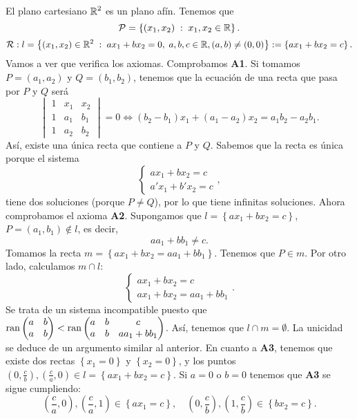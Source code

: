 \begin{eg}
El plano cartesiano $\displaystyle \mathbb{R}^{2} $ es un plano afín. Tenemos que 
\[\mathcal{P  } = \left\{ \left(x_{1}, x_{2}\right) \; : \; x_{1}, x_{2} \in \mathbb{R}\right\}.\]
\[\mathcal{R} : l = \left\{ \left(x_{1}, x_{2}\right) \in \mathbb{R}^{2} \; : \; ax_{1} + bx_{2} = 0, \; a,b,c \in \mathbb{R}, \left(a,b\right) \neq \left(0,0\right)\right\} := \left\{ ax_{1} +bx_{2} = c\right\}  .\]
Vamos a ver que verifica los axiomas. Comprobamos \textbf{A1}. Si tomamos $\displaystyle P = \left(a_{1}, a_{2}\right) $ y $\displaystyle Q = \left(b_{1}, b_{2}\right) $, tenemos que la ecuación de una recta que pasa por $\displaystyle P $ y $\displaystyle Q $ será
\[ \begin{vmatrix} 1 & x_{1} & x_{2} \\ 1 & a_{1} & b_{1} \\ 1 & a_{2} & b_{2} \end{vmatrix} = 0 \iff \left(b_{2}-b_{1}\right)x_{1} + \left(a_{1} - a_{2}\right) x_{2} = a_{1}b_{2}-a_{2}b_{1} .\]
Así, existe una única recta que contiene a $\displaystyle P $ y $\displaystyle Q $. Sabemos que la recta es única porque el sistema
\[
\begin{cases}
ax_{1} + bx_{2} = c \\
a'x_{1} + b'x_{2} = c
\end{cases}
,\]
tiene dos soluciones (porque $\displaystyle P \neq Q $), por lo que tiene infinitas soluciones. Ahora comprobamos el axioma \textbf{A2}. Supongamos que $\displaystyle l = \left\{ ax_{1}+bx_{2} = c\right\}  $, $\displaystyle P = \left(a_{1}, b_{1}\right)\not\in l $, es decir, 
\[a a_{1} + b b_{1} \neq c .\]
Tomamos la recta $\displaystyle m = \left\{ ax_{1} + bx_{2} = a a_{1} + b b_{1}\right\}  $. Tenemos que $\displaystyle P \in m $. Por otro lado, calculamos $\displaystyle m \cap l $:
\[
\begin{cases}
ax_{1} + bx_{2} = c \\
ax_{1} + bx_{2} = a a_{1} + b b_{1}
\end{cases}
.\]
Se trata de un sistema incompatible puesto que $\displaystyle \operatorname{ran} \begin{pmatrix} a & b \\ a & b \end{pmatrix} < \operatorname{ran} \begin{pmatrix} a & b & c \\ a & b &  a a_{1} + b b_{1} \end{pmatrix} $. Así, tenemos que $\displaystyle l \cap m = \emptyset $. La unicidad se deduce de un argumento similar al anterior. En cuanto a \textbf{A3}, tenemos que existe dos rectas $\displaystyle \left\{ x_{1} = 0\right\}  $ y $\displaystyle \left\{ x_{2} = 0\right\}  $, y los puntos $\displaystyle \left(0,\frac{c}{b}\right), \left(\frac{c}{a}, 0\right) \in l = \left\{ ax_{1} + bx_{2} = c\right\}  $.
Si $\displaystyle a = 0 $ o $\displaystyle b = 0 $ tenemos que \textbf{A3} se sigue cumpliendo:
\[ \left(\frac{c}{a}, 0\right), \left(\frac{c}{a}, 1\right) \in \left\{ ax_{1} = c\right\}, \quad \left(0, \frac{c}{b}\right), \left(1, \frac{c}{b}\right) \in \left\{ bx_{2} = c\right\}  .\]
\end{eg}
